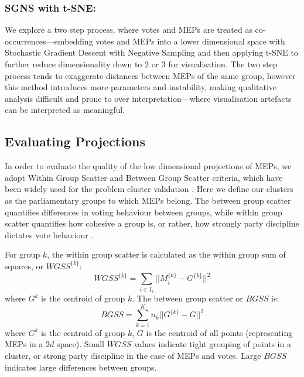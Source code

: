\documentclass{llncs}
\newcommand{\clust}[2][k]{#2^{\{#1\}}}
\begin{document}
\subsubsection{SGNS with t-SNE:}
We explore a two step process, where votes and MEPs are treated as co-occurrences---embedding votes and MEPs into a lower dimensional space with Stochastic Gradient Descent with Negative Sampling \cite{levy2014neural} and then applying t-SNE to further reduce dimensionality down to 2 or 3 for visualisation.  The two step process tends to exaggerate distances between MEPs of the same group, however this method introduces more parameters and instability, making qualitative analysis difficult and prone to over interpretation---where visualisation artefacts can be interpreted as meaningful.

\subsection{Evaluating Projections}
In order to evaluate the quality of the low dimensional projections of MEPs, we adopt Within Group Scatter and Between Group Scatter criteria, which have been widely used for the problem cluster validation \cite{desgraupes2013clustering}. Here we define our clusters as the parliamentary groups to which MEPs belong. The between group scatter quantifies differences in voting behaviour between groups, while within group scatter quantifies how cohesive a group is, or rather, how strongly party discipline dictates vote behaviour \cite{Hix821}. 

For group $k$, the within group scatter is calculated as the within group sum of squares, or $\clust{WGSS}$:
$$
\clust{WGSS} = \sum_{i\in I_{k}} ||\clust{M}_{i}-\clust{G}||^2
$$
where $G^k$ is the centroid of group $k$. The between group scatter or $BGSS$ is:
$$
BGSS=\sum_{k=1}^K n_{k}||\clust{G}-G||^2
$$
where $G^k$ is the centroid of group $k$, $G$ is the centroid of all points (representing MEPs in a $2d$ space). Small $WGSS$ values indicate tight grouping of points in a cluster, or strong party discipline in the case of MEPs and votes. Large $BGSS$ indicates large differences between groups.
\end{document}
